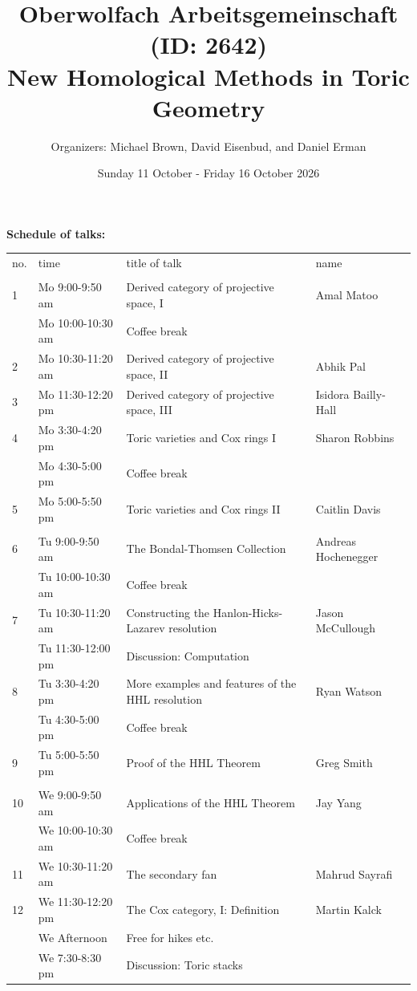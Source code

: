 \documentclass[10pt,a4paper]{article}
\title{Oberwolfach Arbeitsgemeinschaft (ID: 2642) \\
New Homological Methods in Toric Geometry}
\author{Organizers: Michael Brown, David Eisenbud, and Daniel Erman}
\date{Sunday 11 October - Friday 16 October 2026}
\begin{document}
\maketitle

{\bf Schedule of talks:} \\

\begin{tabular}{llll}
no. & time & title of talk & name \\ \\
1  & Mo  9:00-9:50 am & Derived category of projective space, I & Amal Matoo \\
  & Mo  10:00-10:30 am & Coffee break &  \\
2  & Mo 10:30-11:20 am & Derived category of projective space, II & Abhik Pal \\
3  & Mo 11:30-12:20 pm & Derived category of projective space, III & Isidora Bailly-Hall \\
4  & Mo  3:30-4:20  pm  & Toric varieties and Cox rings I & Sharon Robbins \\
  & Mo  4:30-5:00 pm & Coffee break &  \\
5 &  Mo  5:00-5:50  pm & Toric varieties and Cox rings II & Caitlin Davis \\
&&&\\
6  & Tu  9:00-9:50 am & The Bondal-Thomsen Collection & Andreas Hochenegger \\
  & Tu  10:00-10:30 am & Coffee break &  \\
7  & Tu 10:30-11:20 am & Constructing the Hanlon-Hicks-Lazarev resolution & Jason McCullough \\
&Tu 11:30-12:00 pm& Discussion: Computation\\
8  & Tu 3:30-4:20 pm & More examples and features of the HHL resolution & Ryan Watson \\
  & Tu  4:30-5:00 pm & Coffee break &  \\
9  & Tu 5:00-5:50 pm & Proof of the HHL Theorem & Greg Smith \\
&&&\\
10  & We 9:00-9:50 am & Applications of the HHL Theorem & Jay Yang \\
  & We  10:00-10:30 am & Coffee break &  \\
11 & We  10:30-11:20 am & The secondary fan & Mahrud Sayrafi \\
12 & We  11:30-12:20 pm & The Cox category, I: Definition & Martin Kalck \\
  & We Afternoon & Free for hikes etc.&  \\
    & We  7:30-8:30 pm & Discussion: Toric stacks &  \\


\end{tabular}
\end{document}
